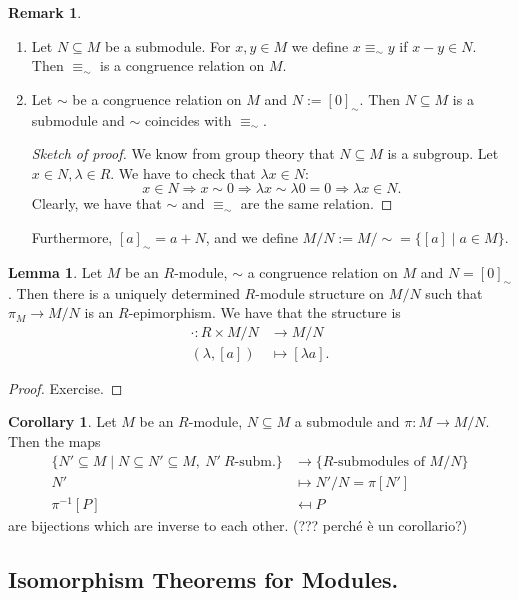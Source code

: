 \documentclass[12pt,a4paper]{report}
\theoremstyle{definition}
\newtheorem{corollary}[theorem]{Corollary} %
\newtheorem{lemma}[theorem]{Lemma}
\newtheorem*{remark}{Remark}
\theoremstyle{num.custom-title}
\DeclareMathOperator{\imp}{\Rightarrow}
\DeclareMathOperator{\sse}{\subseteq}
\begin{document}
\begin{remark}\ 
\begin{enumerate}
\item Let $N \sse M$ be a submodule. For $x,y \in M$ we define $x \equiv_\sim y$ if $x-y \in N$. Then $\equiv_\sim$ is a congruence relation on $M$.
\item Let $\sim$ be a congruence relation on $M$ and $N:=[0]_\sim$. Then $N \sse M$ is a submodule and $\sim$ coincides with $\equiv_\sim$.
\begin{proof}[Sketch of proof]
We know from group theory that $N \sse M$ is a subgroup. Let $x \in N, \lambda \in R$. We have to check that $\lambda x \in N$:
\[
x \in N \imp x \sim 0 \imp \lambda x \sim \lambda 0 = 0 \imp \lambda x \in N.
\]
Clearly, we have that $\sim$ and $\equiv_\sim$ are the same relation.
\end{proof}
Furthermore, $[a]_\sim = a+N$, and we define $M/N := M/{\sim} = \{[a] \mid a \in M\}$.
\end{enumerate}
\end{remark}

\begin{lemma}\label{quotient_mod_str}
Let $M$ be an $R$-module, $\sim$ a congruence relation on $M$ and $N=[0]_\sim$. Then there is a uniquely determined $R$-module structure on $M/N$ such that $\pi_ M \to M/N$ is an $R$-epimorphism. We have that the structure is
\begin{align*}
\cdot \colon R \times M/N &\to M/N \\
(\lambda,[a]) &\mapsto [\lambda a].
\end{align*}
\begin{proof}
Exercise.
\end{proof}
\end{lemma}

\begin{corollary}\label{submod_of_fac_mod}
Let $M$ be an $R$-module, $N \sse M$ a submodule and $\pi : M \to M/N$. Then the maps
\begin{align*}
\{N' \sse M \mid N \sse N' \sse M, \ N' \ R\text{-subm.}\} &\to \{R\text{-submodules of } M/N\} \\
N' & \mapsto N'/N = \pi[N'] \\
\pi^{-1}[P] &\mapsfrom P
\end{align*}
are bijections which are inverse to each other. (??? perché è un corollario?)
\end{corollary}

\subsection{Isomorphism Theorems for Modules.}
\end{document}

